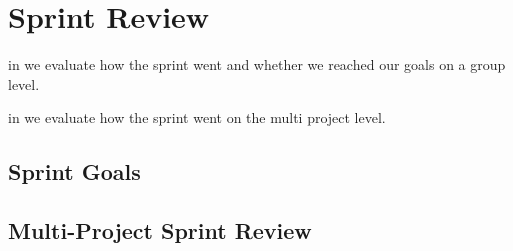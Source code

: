 \chapter{Sprint Review}\label{chap:sprint3_end}

\begin{chapterorganization}
  \item in  we evaluate how the sprint went and whether we reached our goals on a group level.
  \item in  we evaluate how the sprint went on the multi project level.
\end{chapterorganization}

\section{Sprint Goals}\label{sec:s3_goals}
\dummy

\section{Multi-Project Sprint Review}\label{sec:s3_multiprj_review}
\dummy